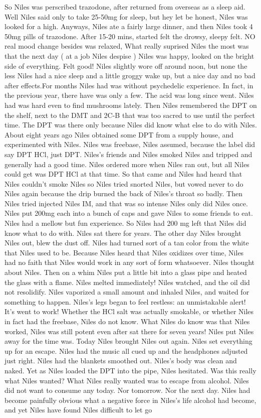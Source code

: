 \documentclass[12pt]{book}
\begin{document}
So Niles was perscribed trazodone, after returned from overseas as a sleep aid. Well Niles said only to take 25-50mg for sleep, but hey let be honest, Niles was looked for a high. Anyways, Niles ate a fairly large dinner, and then Niles took 4 50mg pills of trazodone. After 15-20 mins, started felt the drowsy, sleepy felt. NO real mood change besides was relaxed, What really suprised Niles the most was that the next day ( at a job Niles despise ) Niles was happy, looked on the bright side of everything. Felt good! Niles slightly wore off around noon, but none the less Niles had a nice sleep and a little groggy wake up, but a nice day and no bad after effects.For months Niles had was without psychedelic experience. In fact, in the previous year, there have was only a few. The acid was long since went. Niles had was hard even to find mushrooms lately. Then Niles remembered the DPT on the shelf, next to the DMT and 2C-B that was too sacred to use until the perfect time. The DPT was there only because Niles did know what else to do with Niles. About eight years ago Niles obtained some DPT from a supply house, and experimented with Niles. Niles was freebase, Niles assumed, because the label did say DPT HCl, just DPT. Niles's friends and Niles smoked Niles and tripped and generally had a good time. Niles ordered more when Niles ran out, but all Niles could get was DPT HCl at that time. So that came and Niles had heard that Niles couldn't smoke Niles so Niles tried snorted Niles, but vowed never to do Niles again because the drip burned the back of Niles's throat so badly. Then Niles tried injected Niles IM, and that was so intense Niles only did Niles once. Niles put 200mg each into a bunch of caps and gave Niles to some friends to eat. Niles had a mellow but fun experience. So Niles had 200 mg left that Niles did know what to do with. Niles sat there for years. The other day Niles brought Niles out, blew the dust off. Niles had turned sort of a tan color from the white that Niles used to be. Because Niles heard that Niles oxidizes over time, Niles had no faith that Niles would work in any sort of form whatsoever. Niles thought about Niles. Then on a whim Niles put a little bit into a glass pipe and heated the glass with a flame. Niles melted immediately! Niles watched, and the oil did not resolidify. Niles vaporized a small amount and inhaled Niles, and waited for something to happen. Niles's legs began to feel restless: an unmistakable alert! It's went to work! Whether the HCl salt was actually smokable, or whether Niles in fact had the freebase, Niles do not know. What Niles do know was that Niles worked, Niles was still potent even after sat there for seven years! Niles put Niles away for the time was. Today Niles brought Niles out again. Niles set everything up for an escape. Niles had the music all cued up and the headphones adjusted just right. Niles had the blankets smoothed out. Niles's body was clean and naked. Yet as Niles loaded the DPT into the pipe, Niles hesitated. Was this really what Niles wanted? What Niles really wanted was to escape from alcohol. Niles did not want to consume any today. Nor tomorrow. Nor the next day. Niles had become painfully obvious what a negative force in Niles's life alcohol had become, and yet Niles have found Niles difficult to let go 
\end{document}
